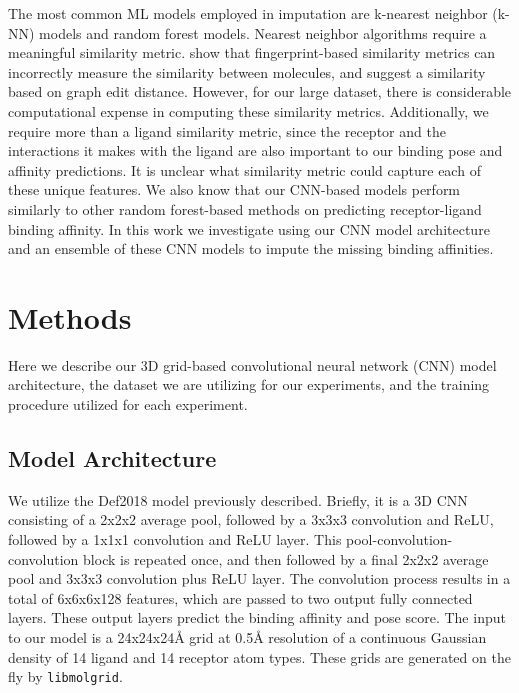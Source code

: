 \documentclass[journal=jcim,manuscript=article]{achemso}
\begin{document}
The most common ML models employed in imputation are k-nearest neighbor (k-NN) models and random forest models.\cite{review2}  Nearest neighbor algorithms require a meaningful similarity metric.
 \citet{graphEditDist} show that fingerprint-based similarity metrics can incorrectly measure the similarity between molecules, and suggest a similarity based on graph edit distance.
However, for our large dataset, there is considerable computational expense in computing these similarity metrics. 
Additionally, we require more than a ligand similarity metric, since the receptor and the interactions it makes with the ligand are also important to our binding pose and affinity predictions.
It is unclear what similarity metric could capture each of these unique features.
We also know that our CNN-based models perform similarly to other random forest-based methods on predicting receptor-ligand binding affinity.\cite{crossdocked2020}
In this work we investigate using our CNN model architecture and an ensemble of these CNN models to impute the missing binding affinities.

\section{Methods}
Here we describe our 3D grid-based convolutional neural network (CNN) model architecture, the dataset we are utilizing for our experiments, and the training procedure utilized for each experiment.

\subsection{Model Architecture}
We utilize the Def2018 model previously described.\cite{crossdocked2020}
Briefly, it is a 3D CNN consisting of a 2x2x2 average pool, followed by a 3x3x3 convolution and ReLU, followed by a 1x1x1 convolution and ReLU layer. 
This pool-convolution-convolution block is repeated once, and then followed by a final 2x2x2 average pool and 3x3x3 convolution plus ReLU layer.
The convolution process results in a total of 6x6x6x128 features, which are passed to two output fully connected layers.
These output layers predict the binding affinity and pose score.
The input to our model is a 24x24x24{\AA} grid at 0.5{\AA} resolution of a continuous Gaussian density of 14 ligand and 14 receptor atom types.
These grids are generated on the fly by \texttt{libmolgrid}.\cite{sunseri2019libmolgrid}
\end{document}
